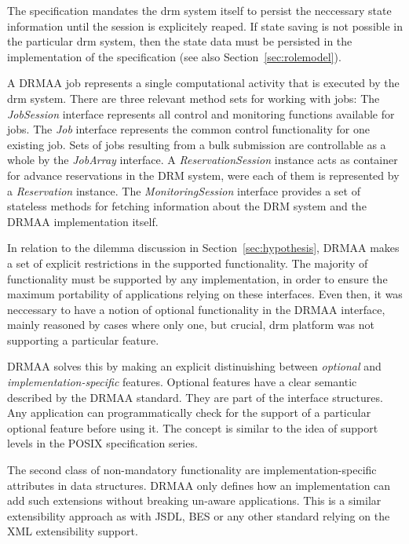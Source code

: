 \documentclass[twocolumn]{svjour3}       %
\begin{document}
The specification mandates the \gls{drm} system itself to persist the neccessary state information until the session is explicitely reaped. If state saving is not possible in the particular \gls{drm} system, then the state data must be persisted in the implementation of the specification (see also Section~\ref{sec:rolemodel}). 

A DRMAA job represents a single computational activity that is executed by the \gls{drm} system. There are three relevant method sets for working with jobs: The \emph{JobSession} interface represents all control and monitoring functions available for jobs. The \emph{Job} interface represents the common control functionality for one existing job. Sets of jobs resulting from a bulk submission are controllable as a whole by the \emph{JobArray} interface. A \emph{ReservationSession} instance acts as container for advance reservations in the DRM system, were each of them is represented by a \emph{Reservation} instance. The \emph{MonitoringSession} interface provides a set of stateless methods for fetching information about the DRM system and the DRMAA implementation itself.

In relation to the dilemma discussion in Section~\ref{sec:hypothesis}, DRMAA makes a set of explicit restrictions in the supported functionality. The majority of functionality must be supported by any implementation, in order to ensure the maximum portability of applications relying on these interfaces. Even then, it was neccessary to have a notion of optional functionality in the DRMAA interface, mainly reasoned by cases where only one, but crucial, \gls{drm} platform was not supporting a particular feature. 

DRMAA solves this by making an explicit distinuishing between \emph{optional} and \emph{implementation-specific} features. Optional features have a clear semantic described by the DRMAA standard. They are part of the interface structures. Any application can programmatically check for the support of a particular optional feature before using it. The concept is similar to the idea of support levels in the POSIX specification series.

The second class of non-mandatory functionality are implementation-specific attributes in data structures. DRMAA only defines how an implementation can add such extensions without breaking un-aware applications. This is a similar extensibility approach as with JSDL, BES or any other standard relying on the XML extensibility support. 
\end{document}
